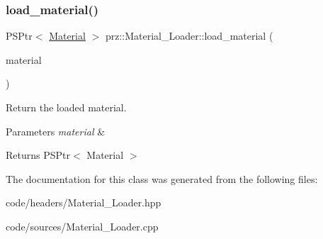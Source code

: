 \subsubsection{\texorpdfstring{load\_material()}{load\_material()}\hspace{0.1cm}{\footnotesize\ttfamily [3/3]}}
{\footnotesize\ttfamily P\+S\+Ptr$<$ \mbox{\hyperlink{classprz_1_1_material}{Material}} $>$ prz\+::\+Material\+\_\+\+Loader\+::load\+\_\+material (\begin{DoxyParamCaption}\item[{P\+S\+Ptr$<$ \mbox{\hyperlink{classprz_1_1_material}{Material}} $>$}]{material }\end{DoxyParamCaption})}



Return the loaded material. 


\begin{DoxyParams}{Parameters}
{\em material} & \\
\hline
\end{DoxyParams}
\begin{DoxyReturn}{Returns}
P\+S\+Ptr$<$ Material $>$ 
\end{DoxyReturn}


The documentation for this class was generated from the following files\+:\begin{DoxyCompactItemize}
\item 
code/headers/Material\+\_\+\+Loader.\+hpp\item 
code/sources/Material\+\_\+\+Loader.\+cpp\end{DoxyCompactItemize}
